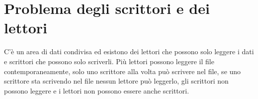 \section{Problema degli scrittori e dei lettori}
C'\`e un area di dati condivisa ed esistono dei lettori che possono solo leggere i dati e scrittori che possono solo scriverli. Pi\`u lettori possono leggere il file contemporaneamente, 
solo uno scrittore alla volta pu\`o scrivere nel file, se uno scrittore sta scrivendo nel file nessun lettore pu\`o leggerlo, gli scrittori non possono leggere e i lettori non possono
essere anche scrittori. 


